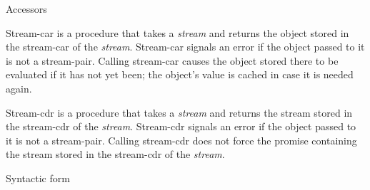 Accessors

\begin{entry}{%
  }

  Stream-car is a procedure that takes a \emph{stream} and returns the
  object stored in the stream-car of the \emph{stream}. Stream-car
  signals an error if the object passed to it is not a
  stream-pair. Calling stream-car causes the object stored there to be
  evaluated if it has not yet been; the object's value is cached in
  case it is needed again.
\end{entry}

\begin{entry}{%
  }

  Stream-cdr is a procedure that takes a \emph{stream} and returns the
  stream stored in the stream-cdr of the \emph{stream}. Stream-cdr
  signals an error if the object passed to it is not a
  stream-pair. Calling stream-cdr does not force the promise
  containing the stream stored in the stream-cdr of the \emph{stream}.
\end{entry}

Syntactic form 

